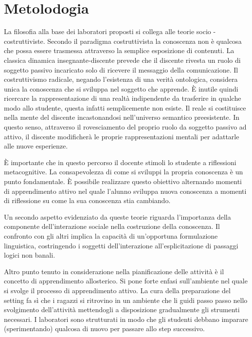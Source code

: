 \documentclass[12pt]{article}
\begin{document}
%
%
\section{Metolodogia}
La filosofia alla base dei laboratori proposti si collega alle teorie socio - costruttiviste. Secondo il paradigma costruttivista la conoscenza non è qualcosa che possa essere trasmessa attraverso la semplice esposizione di contenuti. La classica dinamica insegnante-discente prevede che il discente rivesta un ruolo di soggetto passivo incaricato solo di ricevere il messaggio della comunicazione. Il costruttivismo radicale, negando l'esistenza di una verità ontologica, considera unica la conoscenza che si sviluppa nel soggetto che apprende. È inutile quindi ricercare la rappresentazione di una realtà indipendente da trasferire in qualche modo allo studente, questa infatti semplicemente non esiste. Il reale si costituisce nella mente del discente incastonandosi nell'universo semantico preesistente. In questo senso, attraverso il rovesciamento del proprio ruolo da soggetto passivo ad attivo, il discente modificherà le proprie rappresentazioni mentali per adattarle alle nuove esperienze.

È importante che in questo percorso il docente stimoli lo studente a riflessioni metacognitive. La consapevolezza di come si sviluppi la propria conoscenza è un punto fondamentale. È possibile realizzare questo obiettivo alternando momenti di apprendimento attivo nel quale l'alunno sviluppa nuova conoscenza a momenti di riflessione su come la sua conoscenza stia cambiando.

Un secondo aspetto evidenziato da queste teorie riguarda l'importanza della componente dell'interazione sociale nella costruzione della conoscenza. Il confronto con gli altri implica la capacità di un'opportuna formulazione linguistica, costringendo i soggetti dell'interazione all'esplicitazione di passaggi logici non banali.

Altro punto tenuto in considerazione nella pianificazione delle attività è il concetto di apprendimento allosterico. Si pone forte enfasi sull'ambiente nel quale si svolge il processo di apprendimento attivo. La cura della preparazione del setting fa sì che i ragazzi si ritrovino in un ambiente che li guidi passo passo nello svolgimento dell'attività mettendogli a disposizione gradualmente gli strumenti necessari. I laboratori sono strutturati in modo che gli studenti debbano imparare (sperimentando) qualcosa di nuovo per passare allo step successivo.
\end{document}
